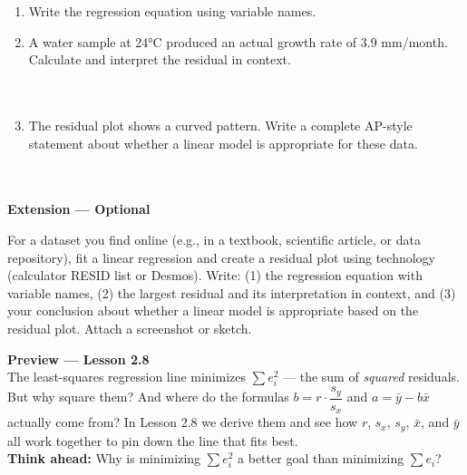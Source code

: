 \documentclass[10pt]{article}
\begin{document}
\vspace{10pt}

\begin{enumerate}[label=\textbf{(\alph*)}, leftmargin=2em, itemsep=0.18in]

  \item Write the regression equation using variable names.\\[8pt]
        \writeline

  \item A water sample at 24°C produced an actual growth rate of 3.9 mm/month. Calculate
        and interpret the residual in context.\\[8pt]
        \writeline\\[3pt]\writeline\\[3pt]\writeline

  \item The residual plot shows a curved pattern. Write a complete AP-style statement about
        whether a linear model is appropriate for these data.\\[8pt]
        \writeline\\[3pt]\writeline\\[3pt]\writeline

\end{enumerate}

\vspace{0.18in}

\begin{extensionbox}
\small\textbf{Extension --- Optional}

For a dataset you find online (e.g., in a textbook, scientific article, or data repository),
fit a linear regression and create a residual plot using technology (calculator RESID list
or Desmos). Write: (1) the regression equation with variable names, (2) the largest
residual and its interpretation in context, and (3) your conclusion about whether a linear
model is appropriate based on the residual plot. Attach a screenshot or sketch.
\end{extensionbox}

\vspace{0.16in}

\begin{tcolorbox}[colback=greenbg, colframe=greenacc, boxrule=0.8pt, arc=2mm,
    left=4mm, right=4mm, top=3mm, bottom=3mm]
\small\textbf{Preview --- Lesson 2.8}\\[4pt]
The least-squares regression line minimizes $\sum e_i^2$ --- the sum of \textit{squared}
residuals. But why square them? And where do the formulas
$b = r \cdot \dfrac{s_y}{s_x}$ and $a = \bar{y} - b\bar{x}$
actually come from? In Lesson 2.8 we derive them and see how $r$, $s_x$, $s_y$, $\bar{x}$,
and $\bar{y}$ all work together to pin down the line that fits best.\\[6pt]
\textbf{Think ahead:} Why is minimizing $\sum e_i^2$ a better goal than minimizing $\sum e_i$?\\[6pt]
\writeline\\[2pt]\writeline
\end{tcolorbox}
\end{document}
